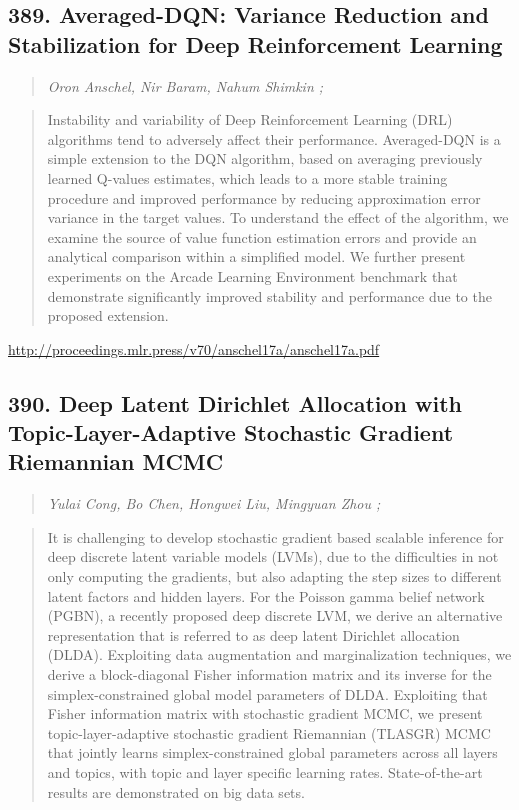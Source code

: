 \documentclass{article}
\begin{document}
\subsection{389. Averaged-DQN: Variance Reduction and Stabilization for Deep Reinforcement Learning}

\begin{quote}
\footnotesize{\textit{Oron Anschel, Nir Baram, Nahum Shimkin ;}}
\end{quote}

\begin{quote}
    Instability and variability of Deep Reinforcement Learning (DRL) algorithms tend to adversely affect their performance. Averaged-DQN is a simple extension to the DQN algorithm, based on averaging previously learned Q-values estimates, which leads to a more stable training procedure and improved performance by reducing approximation error variance in the target values. To understand the effect of the algorithm, we examine the source of value function estimation errors and provide an analytical comparison within a simplified model. We further present experiments on the Arcade Learning Environment benchmark that demonstrate significantly improved stability and performance due to the proposed extension.  \end{quote}

\href{http://proceedings.mlr.press/v70/anschel17a/anschel17a.pdf}{http://proceedings.mlr.press/v70/anschel17a/anschel17a.pdf}

\subsection{390. Deep Latent Dirichlet Allocation with Topic-Layer-Adaptive Stochastic Gradient Riemannian MCMC}

\begin{quote}
\footnotesize{\textit{Yulai Cong, Bo Chen, Hongwei Liu, Mingyuan Zhou ;}}
\end{quote}

\begin{quote}
    It is challenging to develop stochastic gradient based scalable inference for deep discrete latent variable models (LVMs), due to the difficulties in not only computing the gradients, but also adapting the step sizes to different latent factors and hidden layers. For the Poisson gamma belief network (PGBN), a recently proposed deep discrete LVM, we derive an alternative representation that is referred to as deep latent Dirichlet allocation (DLDA). Exploiting data augmentation and marginalization techniques, we derive a block-diagonal Fisher information matrix and its inverse for the simplex-constrained global model parameters of DLDA. Exploiting that Fisher information matrix with stochastic gradient MCMC, we present topic-layer-adaptive stochastic gradient Riemannian (TLASGR) MCMC that jointly learns simplex-constrained global parameters across all layers and topics, with topic and layer specific learning rates. State-of-the-art results are demonstrated on big data sets.  \end{quote}
\end{document}
